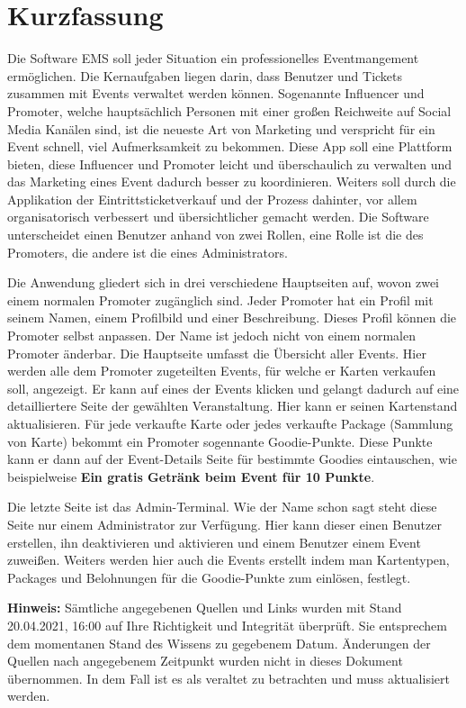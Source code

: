 \chapter{Kurzfassung}
Die Software EMS soll jeder Situation ein professionelles Eventmangement ermöglichen.
Die Kernaufgaben liegen darin, dass Benutzer und Tickets zusammen mit Events verwaltet werden können.
Sogenannte Influencer und Promoter, welche hauptsächlich Personen mit einer großen Reichweite auf Social Media Kanälen sind, ist die neueste Art von Marketing und verspricht für ein Event schnell, viel Aufmerksamkeit zu bekommen.
Diese App soll eine Plattform bieten, diese Influencer und Promoter leicht und überschaulich zu verwalten und das Marketing eines Event dadurch besser zu koordinieren.
Weiters soll durch die Applikation der Eintrittsticketverkauf und der Prozess dahinter, vor allem organisatorisch verbessert und übersichtlicher gemacht werden. 
Die Software unterscheidet einen Benutzer anhand von zwei Rollen, eine Rolle ist die des Promoters, die andere ist die eines Administrators.

Die Anwendung gliedert sich in drei verschiedene Hauptseiten auf, wovon zwei einem normalen Promoter zugänglich sind.
Jeder Promoter hat ein Profil mit seinem Namen, einem Profilbild und einer Beschreibung. Dieses Profil können die Promoter selbst anpassen. Der Name ist jedoch nicht von einem normalen Promoter änderbar.
Die Hauptseite umfasst die Übersicht aller Events. Hier werden alle dem Promoter zugeteilten Events, für welche er Karten verkaufen soll, angezeigt.
Er kann auf eines der Events klicken und gelangt dadurch auf eine detailliertere Seite der gewählten Veranstaltung.
Hier kann er seinen Kartenstand aktualisieren. Für jede verkaufte Karte oder jedes verkaufte Package (Sammlung von Karte) bekommt ein Promoter sogennante Goodie-Punkte.
Diese Punkte kann er dann auf der Event-Details Seite für bestimmte Goodies eintauschen, wie beispielweise \textbf{Ein gratis Getränk beim Event für 10 Punkte}.

Die letzte Seite ist das Admin-Terminal. Wie der Name schon sagt steht diese Seite nur einem Administrator zur Verfügung.
Hier kann dieser einen Benutzer erstellen, ihn deaktivieren und aktivieren und einem Benutzer einem Event zuweißen.
Weiters werden hier auch die Events erstellt indem man Kartentypen, Packages und Belohnungen für die Goodie-Punkte zum einlösen, festlegt.

\textbf{Hinweis:} Sämtliche angegebenen Quellen und Links wurden mit Stand 20.04.2021, 16:00 auf Ihre Richtigkeit und Integrität überprüft. Sie entsprechem dem momentanen
Stand des Wissens zu gegebenem Datum. Änderungen der Quellen nach angegebenem Zeitpunkt wurden nicht in dieses Dokument übernommen. In dem Fall ist es als veraltet zu betrachten
und muss aktualisiert werden.